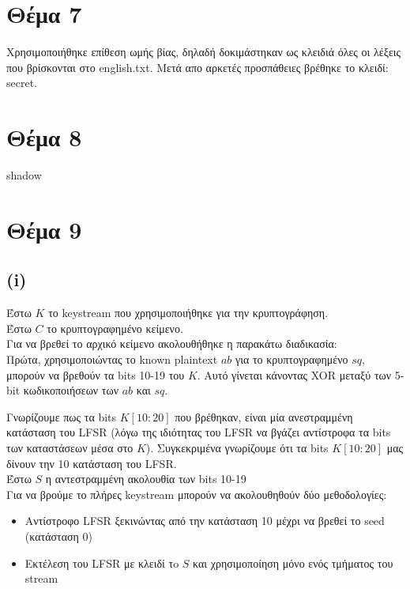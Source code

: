 \documentclass[a4paper, 11pt]{article}
\newcommand{\lt}{\latintext}
\begin{document}
\newpage


\section*{Θέμα 7}
Χρησιμοποιήθηκε επίθεση ωμής βίας, δηλαδή δοκιμάστηκαν ως κλειδιά όλες οι λέξεις που βρίσκονται στο {\lt english.txt}. Μετά απο αρκετές προσπάθειες
βρέθηκε το κλειδί: {\lt secret}.



\newpage


\section*{Θέμα 8}
shadow



\newpage


\section*{Θέμα 9}
\subsection*{{\lt (i)}}
Έστω $K$ το {\lt keystream} που χρησιμοποιήθηκε για την κρυπτογράφηση.\\
Έστω $C$ το κρυπτογραφημένο κείμενο.\\
Για να βρεθεί το αρχικό κείμενο ακολουθήθηκε η παρακάτω διαδικασία:\\

Πρώτα, χρησιμοποιώντας το {\lt known plaintext} $ab$ για το κρυπτογραφημένο $sq$, μπορούν να βρεθούν τα {\lt bits} 10-19 του $Κ$.
Αυτό γίνεται κάνοντας {\lt XOR} μεταξύ των 5-{\lt bit} κωδικοποιήσεων των $ab$ και $sq$.

Γνωρίζουμε πως τα {\lt bits} $Κ[10:20]$ που βρέθηκαν, είναι μία ανεστραμμένη κατάσταση του {\lt LFSR} (λόγω της ιδιότητας του {\lt LFSR} να βγάζει
αντίστροφα τα {\lt bits} των καταστάσεων μέσα στο $K$). Συγκεκριμένα γνωρίζουμε ότι τα {\lt bits} $Κ[10:20]$ μας δίνουν την 10 κατάσταση του {\lt LFSR}.\\

\noindent Έστω $S$ η αντεστραμμένη ακολουθία των {\lt bits} 10-19\\

Για να βρούμε το πλήρες {\lt keystream} μπορούν να ακολουθηθούν δύο μεθοδολογίες:

\begin{itemize}
\item Αντίστροφο {\lt LFSR} ξεκινώντας από την κατάσταση 10 μέχρι να βρεθεί το {\lt seed} (κατάσταση 0)
\item Εκτέλεση του {\lt LFSR} με κλειδί τo $S$ και χρησιμοποίηση μόνο ενός τμήματος του {\lt stream}
\end{itemize}
\end{document}
